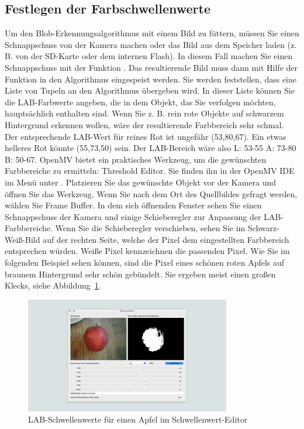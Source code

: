 
\subsection{Festlegen der Farbschwellenwerte}

Um den Blob-Erkennungsalgorithmus mit einem Bild zu füttern, müssen Sie einen Schnappschuss von der Kamera machen oder das Bild aus dem Speicher laden (z. B. von der SD-Karte oder dem internen Flash). In diesem Fall machen Sie einen Schnappschuss mit der Funktion . Das resultierende Bild muss dann mit Hilfe der Funktion  in den Algorithmus eingespeist werden. Sie werden feststellen, dass eine Liste von Tupeln an den Algorithmus übergeben wird. In dieser Liste können Sie die LAB-Farbwerte angeben, die in dem Objekt, das Sie verfolgen möchten, hauptsächlich enthalten sind. Wenn Sie z. B. rein rote Objekte auf schwarzem Hintergrund erkennen wollen, wäre der resultierende Farbbereich sehr schmal. Der entsprechende LAB-Wert für reines Rot ist ungefähr (53,80,67). Ein etwas helleres Rot könnte (55,73,50) sein. Der LAB-Bereich wäre also L: 53-55 A: 73-80 B: 50-67. OpenMV bietet ein praktisches Werkzeug, um die gewünschten Farbbereiche zu ermitteln: Threshold Editor. Sie finden ihn in der OpenMV IDE im Menü unter . Platzieren Sie das gewünschte Objekt vor der Kamera und öffnen Sie das Werkzeug. Wenn Sie nach dem Ort des Quellbildes gefragt werden, wählen Sie \glqq Frame Buffer\grqq{}. In dem sich öffnenden Fenster sehen Sie einen Schnappschuss der Kamera und einige Schieberegler zur Anpassung der LAB-Farbbereiche. Wenn Sie die Schieberegler verschieben, sehen Sie im Schwarz-Weiß-Bild auf der rechten Seite, welche der Pixel dem eingestellten Farbbereich entsprechen würden. Weiße Pixel kennzeichnen die passenden Pixel. Wie Sie im folgenden Beispiel sehen können, sind die Pixel eines schönen roten Apfels auf braunem Hintergrund sehr schön gebündelt. Sie ergeben meist einen großen Klecks, siehe Abbildung~\ref{OpenMVLab}.


\begin{figure}
	\includegraphics[width=0.8\textwidth]{OpenMV/OpenMVLAB}
	
	\caption{LAB-Schwellenwerte für einen Apfel im Schwellenwert-Editor}
	\label{OpenMVLab}
\end{figure}

